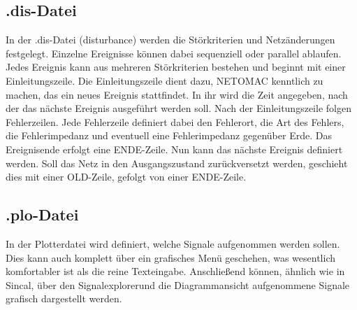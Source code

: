\documentclass{scrartcl}
\begin{document}
\begin{onehalfspace}
\subsection{.dis-Datei}
In der .dis-Datei (\glqq disturbance\grqq) werden die Störkriterien und Netzänderungen festgelegt. Einzelne Ereignisse können dabei sequenziell oder parallel ablaufen. Jedes Ereignis kann aus mehreren Störkriterien bestehen und beginnt mit einer Einleitungszeile. Die Einleitungszeile dient dazu, NETOMAC kenntlich zu machen, das ein neues Ereignis stattfindet. In ihr wird die Zeit angegeben, nach der das nächste Ereignis ausgeführt werden soll. Nach der Einleitungszeile folgen Fehlerzeilen. Jede Fehlerzeile definiert dabei den Fehlerort, die Art des Fehlers, die Fehlerimpedanz und eventuell eine Fehlerimpedanz gegenüber Erde. Das Ereignisende erfolgt eine \glqq ENDE\grqq -Zeile. Nun kann das nächste Ereignis definiert werden. Soll das Netz in den Ausgangszustand zurückversetzt werden, geschieht dies mit einer \glqq OLD\grqq -Zeile, gefolgt von einer \glqq ENDE\grqq -Zeile. 

\subsection{.plo-Datei}
In der Plotterdatei wird definiert, welche Signale aufgenommen werden sollen. Dies kann auch komplett über ein grafisches Menü geschehen, was wesentlich komfortabler ist als die reine Texteingabe. Anschließend können, ähnlich wie in Sincal, über den \glqq Signalexplorer\grqq und die Diagrammansicht aufgenommene Signale grafisch dargestellt werden.







\end{onehalfspace}
\end{document}
